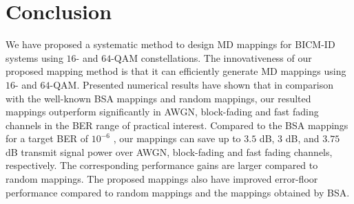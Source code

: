 \documentclass[12pt, draftclsnofoot, onecolumn]{IEEEtran}
\begin{document}
\section{Conclusion}
\label{conc.}
We have proposed a systematic     method to design  MD mappings for BICM-ID systems using  $16$- and $64$-QAM  constellations. The innovativeness of our proposed mapping  method is that it   can  efficiently generate  MD mappings  using $16$- and $64$-QAM.   Presented numerical results have  shown that in comparison with the well-known BSA  mappings   and random mappings, \color{black}   our resulted mappings outperform  significantly in AWGN,    block-fading \color{black}  and  fast fading channels in the BER  range of practical interest.   Compared to the BSA mappings for a target BER of $10^{-6}$ \color{black}, our mappings can save up to { $3.5$} dB, { $3$} dB, and  $3.75$ dB transmit signal power over  AWGN,   block-fading \color{black} and fast fading channels, respectively.   The corresponding performance gains  are larger compared to  random mappings. \color{black}    The proposed mappings also have  improved  error-floor  performance compared to   random mappings and \color{black} the mappings obtained  by BSA. 


\color{black}
\end{document}
